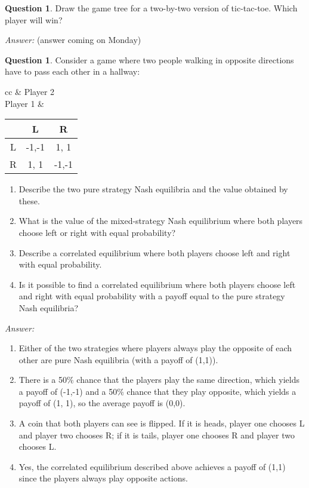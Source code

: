 \documentclass{article}
\theoremstyle{definition}
\newtheorem{question}[thm]{Question}
\newenvironment{answer}{\noindent\textit{Answer:}}{}
\begin{document}
\begin{question}
    Draw the game tree for a two-by-two version of tic-tac-toe. Which player will win?
\end{question}

\begin{answer}
    (answer coming on Monday)
\end{answer}

\begin{question}
    Consider a game where two people walking in opposite directions have to pass each other in a hallway:

\begin{tabular}{cc}
& Player 2 \\
    Player 1 &
    \begin{tabular}{c|c|c|}
          & L & R \\\hline
        L & -1,-1 & 1, 1 \\ \hline
        R & 1, 1 & -1,-1 \\ \hline
    \end{tabular}
\end{tabular}

\begin{enumerate}
    \item Describe the two pure strategy Nash equilibria and the value obtained by these.
    \item What is the value of the mixed-strategy Nash equilibrium where both players choose left or right with equal probability?
    \item Describe a correlated equilibrium where both players choose left and right with equal probability.
    \item Is it possible to find a correlated equilibrium where both players choose left and right with equal probability with a payoff equal to the pure strategy Nash equilibria?
\end{enumerate}

\end{question}

\begin{answer}
    \begin{enumerate}
        \item Either of the two strategies where players always play the opposite of each other are pure Nash equilibria (with a payoff of (1,1)).
        \item There is a 50\% chance that the players play the same direction, which yields a payoff of (-1,-1) and a 50\% chance that they play opposite, which yields a payoff of (1, 1), so the average payoff is (0,0).
        \item A coin that both players can see is flipped. If it is heads, player one chooses L and player two chooses R; if it is tails, player one chooses R and player two chooses L.
        \item Yes, the correlated equilibrium described above achieves a payoff of (1,1) since the players always play opposite actions.
    \end{enumerate} 
\end{answer}
\end{document}
